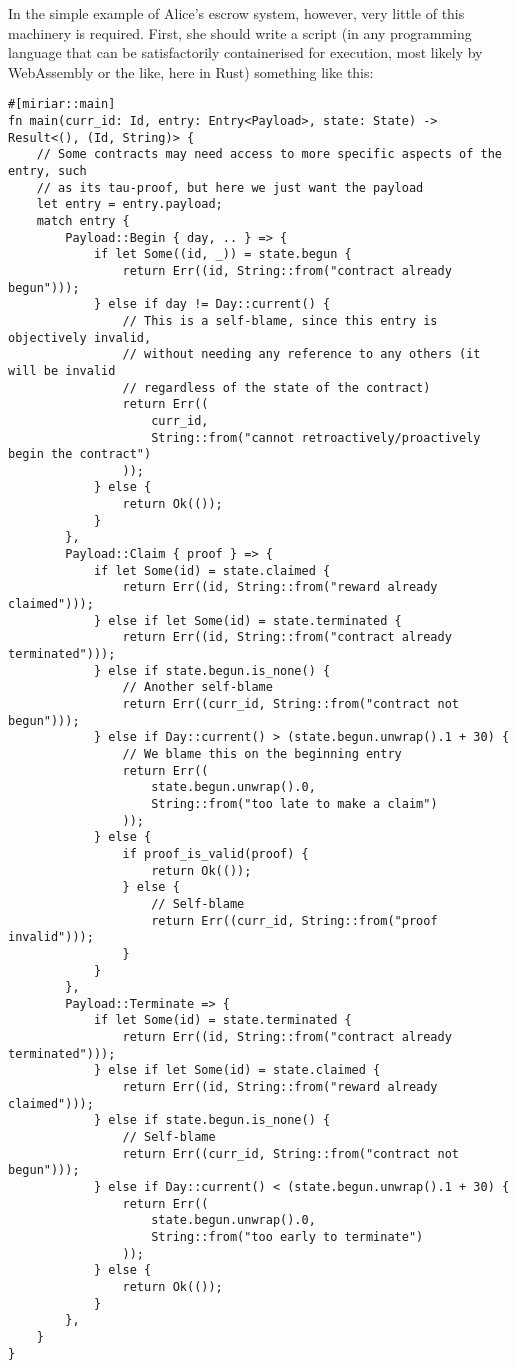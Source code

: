 \documentclass{extreport}
\begin{document}
In the simple example of Alice's escrow system, however, very little of this machinery is required. First, she should write a script (in any programming language that can be satisfactorily containerised for execution, most likely by WebAssembly or the like, here in Rust) something like this:

\begin{verbatim}
#[miriar::main]
fn main(curr_id: Id, entry: Entry<Payload>, state: State) -> Result<(), (Id, String)> {
    // Some contracts may need access to more specific aspects of the entry, such
    // as its tau-proof, but here we just want the payload
    let entry = entry.payload;
    match entry {
        Payload::Begin { day, .. } => {
            if let Some((id, _)) = state.begun {
                return Err((id, String::from("contract already begun")));
            } else if day != Day::current() {
                // This is a self-blame, since this entry is objectively invalid,
                // without needing any reference to any others (it will be invalid
                // regardless of the state of the contract)
                return Err((
                    curr_id,
                    String::from("cannot retroactively/proactively begin the contract")
                ));
            } else {
                return Ok(());
            }
        },
        Payload::Claim { proof } => {
            if let Some(id) = state.claimed {
                return Err((id, String::from("reward already claimed")));
            } else if let Some(id) = state.terminated {
                return Err((id, String::from("contract already terminated")));
            } else if state.begun.is_none() {
                // Another self-blame
                return Err((curr_id, String::from("contract not begun")));
            } else if Day::current() > (state.begun.unwrap().1 + 30) {
                // We blame this on the beginning entry
                return Err((
                    state.begun.unwrap().0,
                    String::from("too late to make a claim")
                ));
            } else {
                if proof_is_valid(proof) {
                    return Ok(());
                } else {
                    // Self-blame
                    return Err((curr_id, String::from("proof invalid")));
                }
            }
        },
        Payload::Terminate => {
            if let Some(id) = state.terminated {
                return Err((id, String::from("contract already terminated")));
            } else if let Some(id) = state.claimed {
                return Err((id, String::from("reward already claimed")));
            } else if state.begun.is_none() {
                // Self-blame
                return Err((curr_id, String::from("contract not begun")));
            } else if Day::current() < (state.begun.unwrap().1 + 30) {
                return Err((
                    state.begun.unwrap().0,
                    String::from("too early to terminate")
                ));
            } else {
                return Ok(());
            }
        },
    }
}


\end{verbatim}
\end{document}
